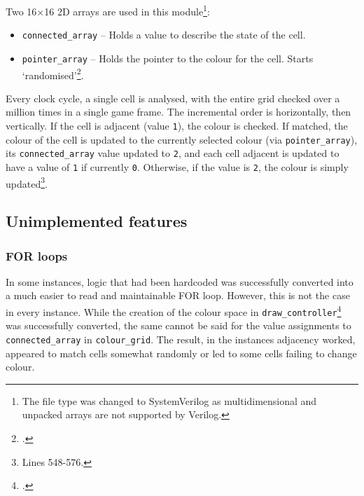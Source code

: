 Two 16$\times$16 2D arrays are used in this module\footnote{
    The file type was changed to SystemVerilog as multidimensional and unpacked arrays are not supported by Verilog. 
}: 
\begin{itemize}
    \item \lstinline|connected_array| -- Holds a value to describe the state of the cell.
    \item \lstinline|pointer_array| -- Holds the pointer to the colour for the cell. Starts `randomised'\footnote{
        .
    }.
\end{itemize}

Every clock cycle, a single cell is analysed, with the entire grid checked over a million times in a single 
game frame. The incremental order is horizontally, then vertically. 
If the cell is adjacent (value \lstinline|1|), the colour is checked. If matched, the colour of the cell is updated 
to the currently selected colour (via \lstinline|pointer_array|), its \lstinline|connected_array| value updated to \lstinline|2|,
and each cell adjacent is updated to have a value of \lstinline|1| if currently \lstinline|0|. 
Otherwise, if the value is \lstinline|2|, the colour is simply updated\footnote{
    Lines 548-576.
}. 

\subsection{Unimplemented features}
\subsubsection{FOR loops}
In some instances, logic that had been hardcoded 
was successfully converted into a much easier to read 
and maintainable FOR loop. However, this is not the case in every instance. While the 
creation of the colour space in \lstinline|draw_controller|\footnote{
    .
} was successfully converted, the same cannot be said for the value assignments 
to \lstinline|connected_array| in \lstinline|colour_grid|. The result, in the 
instances adjacency worked, appeared to match cells somewhat randomly 
or led to some cells failing to change colour. 

